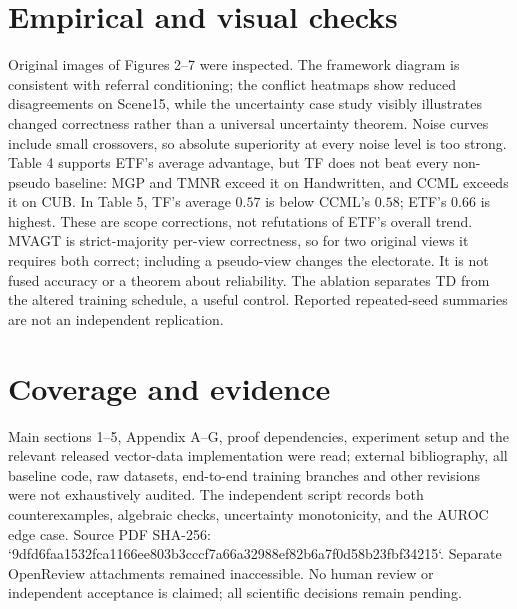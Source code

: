 \documentclass[10pt]{article}
\begin{document}
\section*{Empirical and visual checks}
Original images of Figures 2–7 were inspected. The framework diagram is consistent with referral conditioning; the conflict heatmaps show reduced disagreements on Scene15, while the uncertainty case study visibly illustrates changed correctness rather than a universal uncertainty theorem. Noise curves include small crossovers, so absolute superiority at every noise level is too strong. Table 4 supports ETF’s average advantage, but TF does not beat every non-pseudo baseline: MGP and TMNR exceed it on Handwritten, and CCML exceeds it on CUB. In Table 5, TF’s average \(0.57\) is below CCML’s \(0.58\); ETF’s \(0.66\) is highest. These are scope corrections, not refutations of ETF’s overall trend. MVAGT is strict-majority per-view correctness, so for two original views it requires both correct; including a pseudo-view changes the electorate. It is not fused accuracy or a theorem about reliability. The ablation separates TD from the altered training schedule, a useful control. Reported repeated-seed summaries are not an independent replication.\par
\section*{Coverage and evidence}
Main sections 1–5, Appendix A–G, proof dependencies, experiment setup and the relevant released vector-data implementation were read; external bibliography, all baseline code, raw datasets, end-to-end training branches and other revisions were not exhaustively audited. The independent script records both counterexamples, algebraic checks, uncertainty monotonicity, and the AUROC edge case. Source PDF SHA-256: `9dfd6faa1532fca1166ee803b3cccf7a66a32988ef82b6a7f0d58b23fbf34215`. Separate OpenReview attachments remained inaccessible. No human review or independent acceptance is claimed; all scientific decisions remain pending.\par
\end{document}
